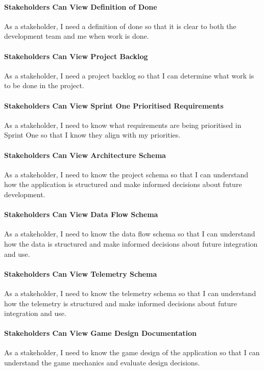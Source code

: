 \paragraph{Stakeholders Can View Definition of Done}
As a stakeholder, I need a definition of done so that it is clear to both the development team and me when work is done.

\paragraph{Stakeholders Can View Project Backlog}
As a stakeholder, I need a project backlog so that I can determine what work is to be done in the project.

\paragraph{Stakeholders Can View Sprint One Prioritised Requirements}
As a stakeholder, I need to know what requirements are being prioritised in Sprint One so that I know they align with my priorities.

\paragraph{Stakeholders Can View Architecture Schema}
As a stakeholder, I need to know the project schema so that I can understand how the application is structured and make informed decisions about future development.

\paragraph{Stakeholders Can View Data Flow Schema}
As a stakeholder, I need to know the data flow schema so that I can understand how the data is structured and make informed decisions about future integration and use.

\paragraph{Stakeholders Can View Telemetry Schema}
As a stakeholder, I need to know the telemetry schema so that I can understand how the telemetry is structured and make informed decisions about future integration and use.

\paragraph{Stakeholders Can View Game Design Documentation}
As a stakeholder, I need to know the game design of the application so that I can understand the game mechanics and evaluate design decisions.

